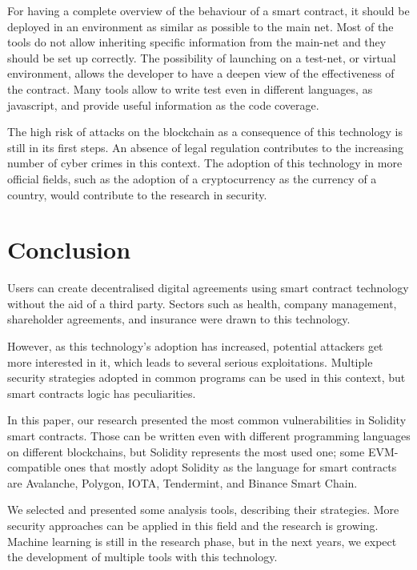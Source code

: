 \documentclass[a4paper,sigconf, language=french,
language=german, language=spanish, language=english]{acmart}
\begin{document}
For having a complete overview of the behaviour of a smart contract, it should be deployed in an environment as similar as possible to the main net. Most of the tools do not allow inheriting specific information from the main-net and they should be set up correctly. 
The possibility of launching on a test-net, or virtual environment, allows the developer to have a deepen view of the effectiveness of the contract. Many tools allow to write test even in different languages, as javascript, and provide useful information as the code coverage.

The high risk of attacks on the blockchain as a consequence of this technology is still in its first steps. An absence of legal regulation contributes to the increasing number of cyber crimes in this context. The adoption of this technology in more official fields, such as the adoption of a cryptocurrency as the currency of a country, would contribute to the research in security.

\section{Conclusion}
\label{Conclusion}
Users can create decentralised digital agreements using smart contract technology without the aid of a third party.
Sectors such as health, company management, shareholder agreements, and insurance were drawn to this technology.

However, as this technology's adoption has increased, potential attackers get more interested in it, which leads to several serious exploitations. 
Multiple security strategies adopted in common programs can be used in this context, but smart contracts logic has peculiarities.

In this paper, our research presented the most common vulnerabilities in Solidity smart contracts. Those can be written even with different programming languages on different blockchains, but Solidity represents the most used one; some EVM-compatible ones that mostly adopt Solidity as the language for smart contracts are Avalanche, Polygon, IOTA, Tendermint, and Binance Smart Chain.

We selected and presented some analysis tools, describing their strategies. More security approaches can be applied in this field and the research is growing. Machine learning is still in the research phase, but in the next years, we expect the development of multiple tools with this technology.




\end{document}
